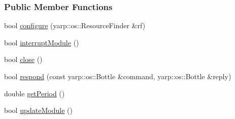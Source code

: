 \subsubsection*{Public Member Functions}
\begin{DoxyCompactItemize}
\item 
bool \hyperlink{group__pasar_a6d5b29ca73e8cc6c01412ed727c0f1c1}{configure} (yarp\+::os\+::\+Resource\+Finder \&rf)
\item 
bool \hyperlink{group__pasar_a4eac5ebe37b69e5806561310bafb9698}{interrupt\+Module} ()
\item 
bool \hyperlink{group__pasar_a06c1d515126a37d8b241ce64eb04aabe}{close} ()
\item 
bool \hyperlink{group__pasar_ae281b878aee48592dd4c2d75dcb44fa9}{respond} (const yarp\+::os\+::\+Bottle \&command, yarp\+::os\+::\+Bottle \&reply)
\item 
double \hyperlink{group__pasar_ad65081730e9591e95fdc39ee42c2622e}{get\+Period} ()
\item 
bool \hyperlink{group__pasar_ae58e47bc057d67d97f4727584f30c0b1}{update\+Module} ()
\end{DoxyCompactItemize}
